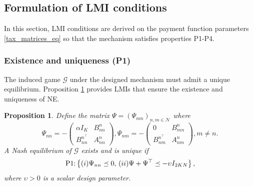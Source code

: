 \documentclass[twocolumn]{autart}
\newtheorem{proposition}{Proposition}
\begin{document}
\subsection{Formulation of LMI conditions}\label{LMI_subsec}
In this section, LMI conditions are derived on the payment function parameters \eqref{tax_matrices_eq} so that the mechanism satisfies properties P1-P4.
\subsubsection{Existence and uniqueness (P1)} The induced game $\mathcal{G}$ under the designed mechanism must admit a unique equilibrium. Proposition \ref{existence_uniqueness_prop} provides LMIs that ensure the existence and uniqueness of NE.

\begin{proposition}\label{existence_uniqueness_prop}
Define the matrix $\Psi=(\Psi_{nm})_{n,m\in\mathcal{N}}$ where 
\[\Psi_{nn}=-\begin{pmatrix}
    \alpha I_K & B_{nn}^n\\
        B_{nn}^{n^\top}& A_{nn}^n
\end{pmatrix}, 
\Psi_{nm}=-\begin{pmatrix}
    0 & B_{mn}^n\\
    B_{nm}^{n^\top} & A_{nm}^n
\end{pmatrix},  m\neq n.\] A Nash equilibrium of $\mathcal{G}$ exists and is unique if
	\begin{equation}\label{existence_uniqueness_cond_eq}
	\textnormal{P1:} \left\{
	(\romannumeral 1) \Psi_{nn}\preceq 0, \,
        (\romannumeral 2) \Psi + \Psi^\top \preceq -\upsilon I_{2KN}
	\right\},
	\end{equation}
    where $\upsilon>0$ is a scalar design parameter. 
\end{proposition}
\end{document}
